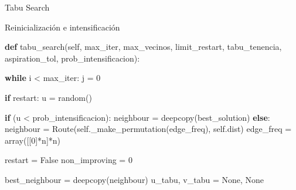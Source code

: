 \documentclass[ignorenonframetext,]{beamer}
\newenvironment{Shaded}{}{}
\newcommand{\KeywordTok}[1]{\textcolor[rgb]{0.00,0.44,0.13}{\textbf{{#1}}}}
\newcommand{\DecValTok}[1]{\textcolor[rgb]{0.25,0.63,0.44}{{#1}}}
\newcommand{\OtherTok}[1]{\textcolor[rgb]{0.00,0.44,0.13}{{#1}}}
\newcommand{\NormalTok}[1]{{#1}}
\begin{document}
\begin{frame}[fragile]{Tabu Search}

\begin{block}{Reinicialización e intensificación}

\begin{Shaded}
\begin{Highlighting}[]
\KeywordTok{def} \NormalTok{tabu_search(}\OtherTok{self}\NormalTok{, max_iter, max_vecinos, limit_restart, }
                \NormalTok{tabu_tenencia, aspiration_tol, prob_intensificacion):}

    \KeywordTok{while} \NormalTok{i < max_iter:                }
        \NormalTok{j = }\DecValTok{0}

        \KeywordTok{if} \NormalTok{restart:}
            \NormalTok{u = random()}

            \KeywordTok{if} \NormalTok{(u < prob_intensificacion):}
                \NormalTok{neighbour = deepcopy(best_solution)}
            \KeywordTok{else}\NormalTok{: }
                \NormalTok{neighbour = Route(}\OtherTok{self}\NormalTok{._make_permutation(edge_freq), }\OtherTok{self}\NormalTok{.dist)}
                \NormalTok{edge_freq = array([[}\DecValTok{0}\NormalTok{]*n]*n)}

            \NormalTok{restart = }\OtherTok{False}
            \NormalTok{non_improving = }\DecValTok{0}                    

        \NormalTok{best_neighbour = deepcopy(neighbour)}
        \NormalTok{u_tabu, v_tabu = }\OtherTok{None}\NormalTok{, }\OtherTok{None}
\end{Highlighting}
\end{Shaded}

\end{block}

\end{frame}
\end{document}
